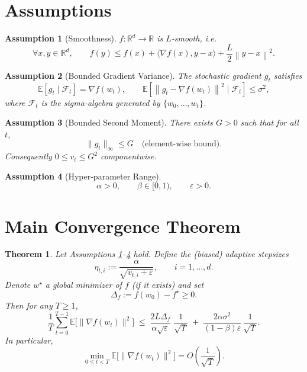 \documentclass{article}
\newtheorem{theorem}{Theorem}
\newtheorem{assumption}{Assumption}
\newcommand{\E}{\mathbb{E}}
\newcommand{\R}{\mathbb{R}}
\newcommand{\norm}[1]{\left\lVert #1\right\rVert}
\begin{document}
\section*{Assumptions}
\begin{assumption}[Smoothness]\label{as:smooth}
$f:\R^d\to\R$ is $L$‑smooth, i.e.
\[
\forall x,y\in\R^d,\qquad 
f(y)\le f(x)+\langle\nabla f(x),y-x\rangle+\frac{L}{2}\norm{y-x}^2 .
\]
\end{assumption}
\begin{assumption}[Bounded Gradient Variance]\label{as:variance}
The stochastic gradient $g_t$ satisfies
\[
\E\!\left[g_t\mid\mathcal F_t\right]=\nabla f(w_t), \qquad
\E\!\left[\norm{g_t-\nabla f(w_t)}^2\mid\mathcal F_t\right]\le\sigma^2,
\]
where $\mathcal F_t$ is the sigma‑algebra generated by $\{w_0,\dots,w_t\}$.
\end{assumption}
\begin{assumption}[Bounded Second Moment]\label{as:bounded}
There exists $G>0$ such that for all $t$,
\[
\|g_t\|_\infty\le G\quad\text{(element‑wise bound)}.
\]
Consequently $0\le v_t\le G^2$ componentwise.
\end{assumption}
\begin{assumption}[Hyper‑parameter Range]\label{as:hyper}
\[
\alpha>0,\qquad \beta\in[0,1),\qquad \varepsilon>0.
\]
\end{assumption}

\section*{Main Convergence Theorem}
\begin{theorem}\label{thm:main}
Let Assumptions \ref{as:smooth}–\ref{as:hyper} hold.  
Define the (biased) adaptive stepsizes
\[
\eta_{t,i}:=\frac{\alpha}{\sqrt{v_{t,i}+\varepsilon}},\qquad i=1,\dots,d.
\]
Denote $w^\star$ a global minimizer of $f$ (if it exists) and set
\[
\Delta_f:=f(w_0)-f^\star\ge0.
\]
Then for any $T\ge1$,
\[
\frac{1}{T}\sum_{t=0}^{T-1}\E\!\big[\|\nabla f(w_t)\|^2\big]
\;\le\;
\frac{2L\Delta_f}{\alpha\sqrt{\varepsilon}}\;
\frac{1}{\sqrt{T}}
\;+\;
\frac{2\alpha\sigma^2}{(1-\beta)\varepsilon}\,
\frac{1}{\sqrt{T}} .
\]
In particular,
\[
\min_{0\le t<T}\E\!\big[\|\nabla f(w_t)\|^2\big]
=O\!\left(\frac{1}{\sqrt{T}}\right).
\]
\end{theorem}
\end{document}
